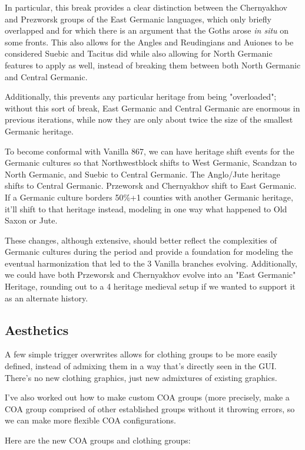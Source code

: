 \documentclass{article}
\begin{document}
	In particular, this break provides a clear distinction between the Chernyakhov and Prezworsk groups of the East Germanic languages, which only briefly overlapped and for which there is an argument that the Goths arose \textit{in situ} on some fronts.
	This also allows for the Angles and Reudingians and Auiones to be considered Suebic and Tacitus did while also allowing for North Germanic features to apply as well, instead of breaking them between both North Germanic and Central Germanic.
	
	Additionally, this prevents any particular heritage from being "overloaded"; without this sort of break, East Germanic and Central Germanic are enormous in previous iterations, while now they are only about twice the size of the smallest Germanic heritage.
	
	To become conformal with Vanilla 867, we can have heritage shift events for the Germanic cultures so that Northwestblock shifts to West Germanic, Scandzan to North Germanic, and Suebic to Central Germanic.
	The Anglo/Jute heritage shifts to Central Germanic.
	Przeworsk and Chernyakhov shift to East Germanic.
	If a Germanic culture borders 50\%+1 counties with another Germanic heritage, it'll shift to that heritage instead, modeling in one way what happened to Old Saxon or Jute.
	
	These changes, although extensive, should better reflect the complexities of Germanic cultures during the period and provide a foundation for modeling the eventual harmonization that led to the 3 Vanilla branches evolving.
	Additionally, we could have both Przeworsk and Chernyakhov evolve into an "East Germanic" Heritage, rounding out to a 4 heritage medieval setup if we wanted to support it as an alternate history. 
	
	\subsection{Aesthetics}
	\label{sec:culture_review:subsec:aesthetics}
	A few simple trigger overwrites allows for clothing groups to be more easily defined, instead of admixing them in a way that’s directly seen in the GUI. There’s no new clothing graphics, just new admixtures of existing graphics.
	
	I’ve also worked out how to make custom COA groups (more precisely, make a COA group comprised of other established groups without it throwing errors, so we can make more flexible COA configurations.
	
	Here are the new COA groups and clothing groups:
	
\end{document}
